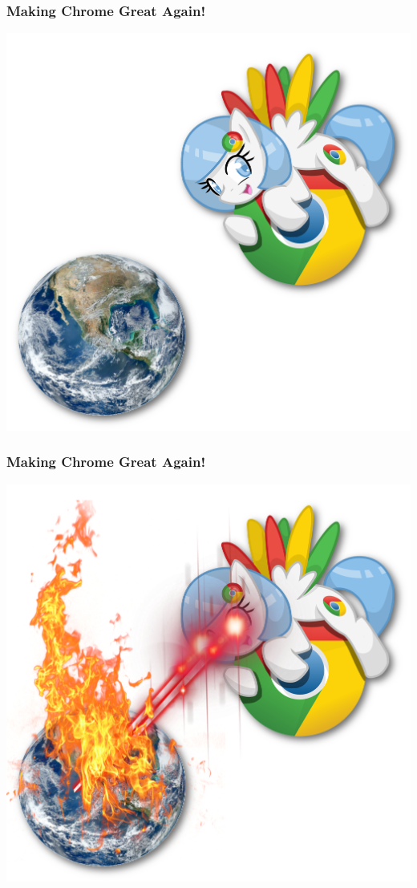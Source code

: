 \documentclass[aspectratio=169]{beamer}
\begin{document}
\begin{frame}
  \addtocounter{framenumber}{-1}
  \frametitle{Making Chrome Great Again!}
  \begin{center}
    \includegraphics[scale=1]{chrome_pony_good}
  \end{center}
\end{frame}
\begin{frame}
  \addtocounter{framenumber}{-1}
  \frametitle{Making Chrome Great Again!}
  \begin{center}
    \includegraphics[scale=1]{chrome_pony_evil}
  \end{center}
\end{frame}
\end{document}
